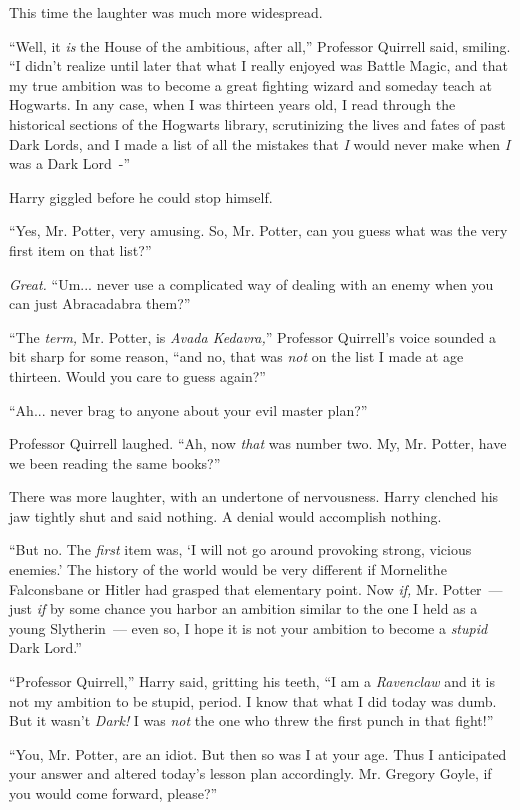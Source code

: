 This time the laughter was much more widespread.

``Well, it \emph{is} the House of the ambitious, after all,'' Professor Quirrell said, smiling. ``I didn't realize until later that what I really enjoyed was Battle Magic, and that my true ambition was to become a great fighting wizard and someday teach at Hogwarts. In any case, when I was thirteen years old, I read through the historical sections of the Hogwarts library, scrutinizing the lives and fates of past Dark Lords, and I made a list of all the mistakes that \emph{I} would never make when \emph{I} was a Dark Lord~-''

Harry giggled before he could stop himself.

``Yes, Mr. Potter, very amusing. So, Mr. Potter, can you guess what was the very first item on that list?''

\emph{Great.} ``Um... never use a complicated way of dealing with an enemy when you can just Abracadabra them?''

``The \emph{term,} Mr. Potter, is \emph{Avada Kedavra,}'' Professor Quirrell's voice sounded a bit sharp for some reason, ``and no, that was \emph{not} on the list I made at age thirteen. Would you care to guess again?''

``Ah... never brag to anyone about your evil master plan?''

Professor Quirrell laughed. ``Ah, now \emph{that} was number two. My, Mr. Potter, have we been reading the same books?''

There was more laughter, with an undertone of nervousness. Harry clenched his jaw tightly shut and said nothing. A denial would accomplish nothing.

``But no. The \emph{first} item was, `I will not go around provoking strong, vicious enemies.' The history of the world would be very different if Mornelithe Falconsbane or Hitler had grasped that elementary point. Now \emph{if,} Mr. Potter~--- just \emph{if} by some chance you harbor an ambition similar to the one I held as a young Slytherin~--- even so, I hope it is not your ambition to become a \emph{stupid} Dark Lord.''

``Professor Quirrell,'' Harry said, gritting his teeth, ``I am a \emph{Ravenclaw} and it is not my ambition to be stupid, period. I know that what I did today was dumb. But it wasn't \emph{Dark!} I was \emph{not} the one who threw the first punch in that fight!''

``You, Mr. Potter, are an idiot. But then so was I at your age. Thus I anticipated your answer and altered today's lesson plan accordingly. Mr. Gregory Goyle, if you would come forward, please?''

